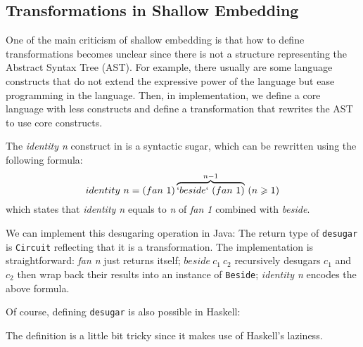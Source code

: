 \subsection{Transformations in Shallow Embedding}
One of the main criticism of shallow embedding is that how to define transformations
becomes unclear since there is not a structure representing the Abstract Syntax Tree (AST).
For example, there usually are some language constructs that do not extend the
expressive power of the language but ease programming in the language.
Then, in implementation, we define a core language with less constructs and
define a transformation that rewrites the AST to use core constructs.

The \emph{identity n} construct in \dsl is a syntactic sugar, which can
be rewritten using the following formula:
$$identity\ n = (fan\ 1) \overbrace{`beside`\ (fan\ 1)}^{n-1}\ (n \geq 1)$$
which states that \emph{identity n} equals to \emph{n} of \emph{fan 1} combined
with \emph{beside}.

We can implement this desugaring operation in Java:
The return type of \texttt{desugar} is \texttt{Circuit} reflecting that it is a
transformation. The implementation is straightforward: \emph{fan n} just returns
itself; $beside\ c_1\ c_2$ recursively desugars $c_1$ and $c_2$ then wrap back
their results into an instance of \texttt{Beside}; \emph{identity n} encodes the above
formula.

Of course, defining \texttt{desugar} is also possible in Haskell:

The definition is a little bit tricky since it makes use of Haskell's laziness.
